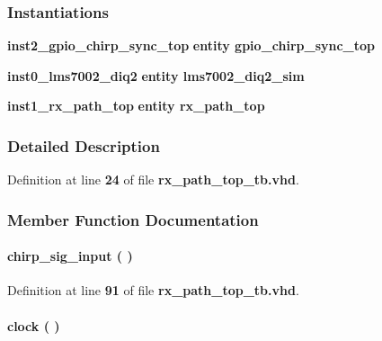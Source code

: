 \subsubsection*{Instantiations}
 \begin{DoxyCompactItemize}
\item 
{\bf inst2\+\_\+gpio\+\_\+chirp\+\_\+sync\+\_\+top}  {\bfseries entity gpio\+\_\+chirp\+\_\+sync\+\_\+top}   
\item 
{\bf inst0\+\_\+lms7002\+\_\+diq2}  {\bfseries entity lms7002\+\_\+diq2\+\_\+sim}   
\item 
{\bf inst1\+\_\+rx\+\_\+path\+\_\+top}  {\bfseries entity rx\+\_\+path\+\_\+top}   
\end{DoxyCompactItemize}


\subsubsection{Detailed Description}


Definition at line {\bf 24} of file {\bf rx\+\_\+path\+\_\+top\+\_\+tb.\+vhd}.



\subsubsection{Member Function Documentation}
\paragraph[{chirp\+\_\+sig\+\_\+input}]{\setlength{\rightskip}{0pt plus 5cm} {\bfseries \textcolor{vhdlchar}{ }} chirp\+\_\+sig\+\_\+input ( ) \hspace{0.3cm}{\ttfamily [Process]}}\label{classrx__path__top__tb_1_1tb__behave_a6fe5a4e9998bfd3b213124d51d8c3aae}


Definition at line {\bf 91} of file {\bf rx\+\_\+path\+\_\+top\+\_\+tb.\+vhd}.

\paragraph[{clock}]{\setlength{\rightskip}{0pt plus 5cm} {\bfseries \textcolor{vhdlchar}{ }} clock ( ) \hspace{0.3cm}{\ttfamily [Process]}}\label{classrx__path__top__tb_1_1tb__behave_af761a67e9d7ce9e23381088b6f2ae893}


